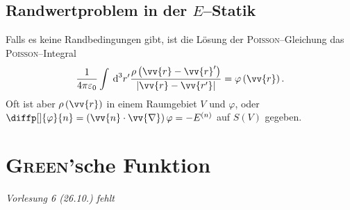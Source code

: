 \documentclass[a4paper,12pt]{article}
\newcommand{\td}{\,\text{d}}
\numberwithin{equation}{section}
\begin{document}
\subsection{Randwertproblem in der $E$--Statik}
Falls es keine Randbedingungen gibt, ist die Lösung der \textsc{Poisson}--Gleichung das \textsc{Poisson}--Integral
\begin{align} 
        \dfrac{1}{4\pi \varepsilon _0}\int_{}^{}\td ^3r'\dfrac{\rho \left(\vv{r}-\vv{r}'\right)}{|\vv{r}-\vv{r'}|}=\varphi \left(\vv{r}\right)
.\end{align} 
Oft ist aber $\rho \left(\vv{r}\right)$ in einem Raumgebiet $V$ und $\varphi $, oder $\diffp[]{\varphi }{n}=\left(\vv{n}\cdot \vv{\nabla }\right)\varphi =-E^{\left(n\right)}$ auf $S\left(V\right)$ gegeben.

\newpage
\newpage
\section{\textsc{Green}'sche Funktion}
\textit{Vorlesung 6 (26.10.) fehlt}
\newpage

\newpage
\end{document}
